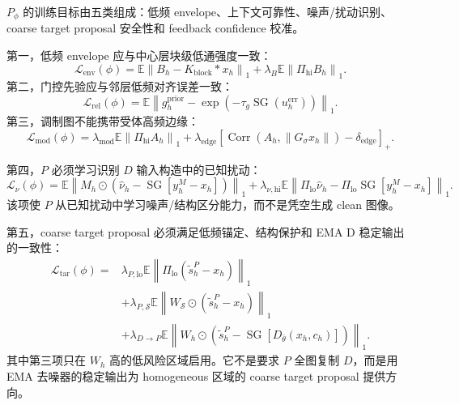 \documentclass[11pt,a4paper,UTF8,fontset=fandol]{ctexart}
\theoremstyle{definition}
\DeclareMathOperator{\SG}{SG}
\newcommand{\norm}[1]{\left\lVert#1\right\rVert}
\newcommand{\E}{\mathbb{E}}
\newcommand{\cL}{\mathcal{L}}
\begin{document}
$P_\phi$ 的训练目标由五类组成：低频 envelope、上下文可靠性、噪声/扰动识别、coarse target proposal 安全性和 feedback confidence 校准。

第一，低频 envelope 应与中心层块级低通强度一致：
\begin{equation}
\label{eq:envelope-loss-coreB}
    \cL_{\mathrm{env}}(\phi)
    =\E\norm{B_h-K_{\mathrm{block}}*x_h}_1
    +\lambda_B\E\norm{\Pi_{\mathrm{hi}}B_h}_1.
\end{equation}
第二，门控先验应与邻层低频对齐误差一致：
\begin{equation}
\label{eq:reliability-loss-coreB}
    \cL_{\mathrm{rel}}(\phi)
    =\E\norm{g_h^{\mathrm{prior}}-\exp(-\tau_g\SG(u_h^{\mathrm{err}}))}_1.
\end{equation}
第三，调制图不能携带受体高频边缘：
\begin{equation}
\label{eq:mod-leak-loss-coreB}
    \cL_{\mathrm{mod}}(\phi)
    =\lambda_{\mathrm{mod}}\E\norm{\Pi_{\mathrm{hi}}A_h}_1
    +\lambda_{\mathrm{edge}}\left[\operatorname{Corr}(A_h,\norm{G_\sigma x_h})-\delta_{\mathrm{edge}}\right]_+.
\end{equation}

第四，$P$ 必须学习识别 $D$ 输入构造中的已知扰动：
\begin{equation}
\label{eq:nu-loss-coreB}
    \cL_\nu(\phi)
    =\E\norm{M_h\odot(\widehat\nu_h-\SG[y_h^M-x_h])}_1
    +\lambda_{\nu,\mathrm{hi}}\E\norm{\Pi_{\mathrm{lo}}\widehat\nu_h-\Pi_{\mathrm{lo}}\SG[y_h^M-x_h]}_1.
\end{equation}
该项使 $P$ 从已知扰动中学习噪声/结构区分能力，而不是凭空生成 clean 图像。

第五，coarse target proposal 必须满足低频锚定、结构保护和 EMA D 稳定输出的一致性：
\begin{equation}
\label{eq:target-proposal-loss-coreB}
\begin{aligned}
\cL_{\mathrm{tar}}(\phi)
={}&\lambda_{P,\mathrm{lo}}\E\norm{\Pi_{\mathrm{lo}}(\tilde s_h^P-x_h)}_1\\
&+\lambda_{P,\mathcal S}\E\norm{W_{\mathcal S}\odot(\tilde s_h^P-x_h)}_1\\
&+\lambda_{D\to P}\E\norm{W_h\odot(\tilde s_h^P-\SG[D_{\bar\theta}(x_h,c_h)])}_1.
\end{aligned}
\end{equation}
其中第三项只在 $W_h$ 高的低风险区域启用。它不是要求 $P$ 全图复制 $D$，而是用 EMA 去噪器的稳定输出为 homogeneous 区域的 coarse target proposal 提供方向。
\end{document}
